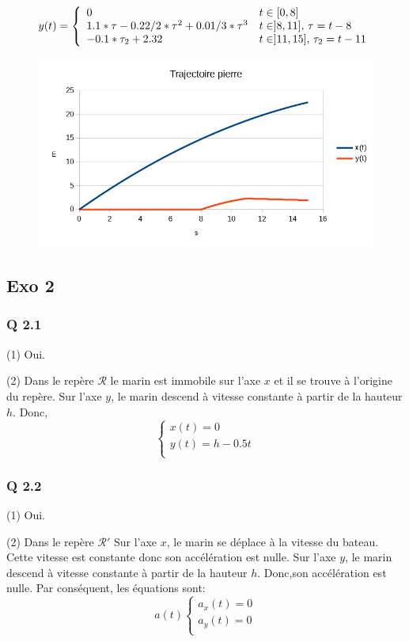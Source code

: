 \documentclass[]{book}
\theoremstyle{definition}
\begin{document}
$$ y(t) =
\left\{ 
\begin{array}{l l}
0 &  t \in [0,8] \\
1.1*\tau - 0.22/2*\tau^2 + 0.01/3*\tau^3 &  t \in ]8,11],\, \tau = t-8 \\
-0.1*\tau_2+2.32 &  t \in ]11,15],\, \tau_2 = t-11 \\
\end{array}
\right. 
$$

\begin{figure}[h!]
  \includegraphics[width=1\linewidth]{DM1_graph1.jpg}
\end{figure}



\subsection*{Exo 2}
\subsubsection*{Q 2.1}
(1) Oui.


(2) Dans le rep\`ere $\mathcal{R}$ le marin est immobile sur l'axe $x$ et il se trouve \`a l'origine du rep\`ere.
Sur l'axe $y$, le marin descend \`a vitesse constante \`a partir de la hauteur $h$. Donc, 
$$ 
\left\{ 
\begin{array}{l}
x(t) = 0 \\
y(t) = h -0.5t \\
\end{array}
\right. 
$$

\subsubsection*{Q 2.2}
(1) Oui.

(2) Dans le rep\`ere $\mathcal{R'}$ Sur l'axe $x$, le marin se d\'eplace \`a la vitesse du bateau. Cette vitesse est 
constante donc son acc\'el\'eration est nulle.
Sur l'axe $y$, le marin descend \`a vitesse constante \`a partir de la hauteur $h$. Donc,son acc\'el\'eration est nulle.  
Par cons\'equent, les \'equations sont:
$$ a(t)
\left\{ 
\begin{array}{l}
a_x(t) = 0 \\
a_y(t) = 0 \\
\end{array}
\right. 
$$
\end{document}
